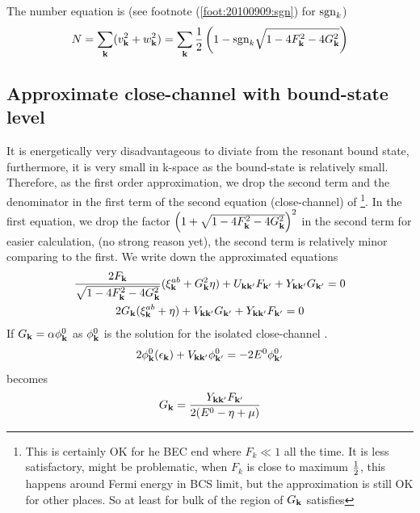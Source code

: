 \documentclass{article}
\begin{document}
The number equation is (see footnote (\ref{foot:20100909:sgn}) for $\text{sgn}_{k}$)
\begin{equation}\label{eq:20100909:number}
N=\sum_{\mathbf{k}}(v_{\mathbf{k}}^{2}+w_{\mathbf{k}}^{2})=\sum_{\mathbf{k}}\frac{1}{2} \left(1-\text{sgn}_{k}\sqrt{1-4 F_{\mathbf{k}}^2-4 G_{\mathbf{k}}^2}\right)
\end{equation} 


\subsection{Approximate close-channel with bound-state level}
It is energetically very disadvantageous to diviate from the resonant bound state, furthermore, it is very small in k-space as the bound-state is relatively small.  Therefore, as the first order approximation, we drop the second term and the denominator in the first term of the second equation (close-channel) of \footnote{ This is certainly OK for he BEC end where $F_{k}\ll1$ all the time.  It is less satisfactory, might be problematic,  when $F_{k}$ is close to maximum $\frac{1}{2}$, this happens around Fermi energy in BCS limit, but the approximation is still OK for other places. So at least for bulk of the region of $G_{\mathbf{k}}$ satisfies }.  In the first equation, we drop the factor $\left(1+\sqrt{1-4 F_{\mathbf{k}}^2-4 G_{\mathbf{k}}^2}\right)^2$ in the second term for easier calculation, (no strong reason yet), the second term is relatively minor comparing to the first. We write down the approximated equations
\begin{subequations}\label{eq:20100915:gap}
\begin{gather}\label{eq:20100915:gapa}
\frac{2F_{\mathbf{k}}}{\sqrt{1-4 F_{\mathbf{k}}^2-4 G_{\mathbf{k}}^2}} (\xi^{ab}_{\mathbf{k}}+  G_{\mathbf{k}}^2\eta)+U_{\mathbf{k}\mathbf{k}'}F_{\mathbf{k}'}+Y_{\mathbf{k}\mathbf{k}'}G_{\mathbf{k}'}=0\\
\label{eq:20100915:gapb}
{2G_{\ensuremath{\mathbf{k}}}}(\xi^{ab}_{\mathbf{k}}+\eta)+V_{\mathbf{k}\mathbf{k}'}G_{\mathbf{k}'}+Y_{\mathbf{k}\mathbf{k}'}F_{\mathbf{k}'}=0
\end{gather}
\end{subequations}
If $G_{\mathbf{k}}=\alpha\phi^{0}_{\mathbf{k}}$ as $\phi_{\mathbf{k}}^{0}$ is the solution for the isolated close-channel \sch.  
\begin{equation}\label{eq:20100915:twobody}
{2\phi^{0}_{\ensuremath{\mathbf{k}}}}(\epsilon_{\mathbf{k}})+V_{\mathbf{k}\mathbf{k}'}\phi^{0}_{\mathbf{k}'}=-2E^{0}\phi^{0}_{\mathbf{k}'}
\end{equation}
 becomes
\begin{equation}
G_{\mathbf{k}}=\frac{Y_{\mathbf{k}\mathbf{k}'}F_{\mathbf{k}'}}{2(E^{0}-\eta+\mu)}
\end{equation}
\end{document}
